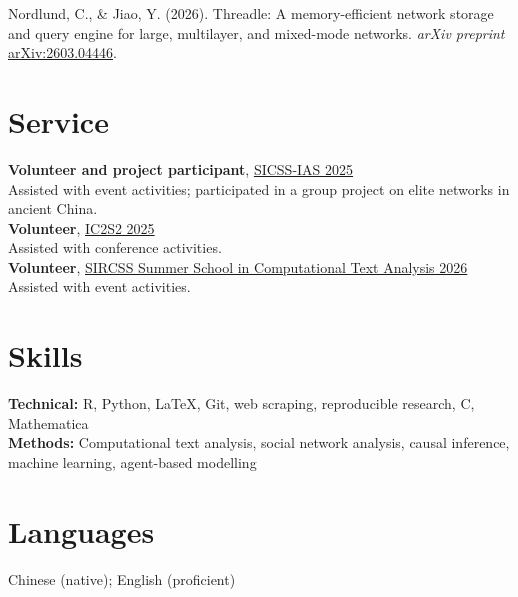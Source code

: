 \documentclass[11pt,a4paper]{article}
\newcommand{\Cpp}{C\nolinebreak\hspace{-.05em}\raisebox{.3ex}{\small ++}}
\begin{document}
Nordlund, C., \& Jiao, Y. (2026). Threadle: A memory-efficient network storage and query engine for large, multilayer, and mixed-mode networks. \textit{arXiv preprint} \href{https://arxiv.org/abs/2603.04446}{arXiv:2603.04446}.

\section{Service}

\textbf{Volunteer and project participant}, \href{https://sicss.io/2025/ias/}{SICSS-IAS 2025}\\
Assisted with event activities; participated in a group project on elite networks in ancient China.\\
\textbf{Volunteer}, \href{https://ic2s2-2025.org}{IC2S2 2025}\\
Assisted with conference activities.\\
\textbf{Volunteer}, \href{https://liu.se/en/research/research-school-in-computational-social-science}{SIRCSS Summer School in Computational Text Analysis 2026}\\
Assisted with event activities.

\section{Skills}

\textbf{Technical:} R, Python, \LaTeX, Git, web scraping, reproducible research, \Cpp, Mathematica\\
\textbf{Methods:} Computational text analysis, social network analysis, causal inference, machine learning, agent-based modelling

\section{Languages}

Chinese (native); English (proficient)
\end{document}
